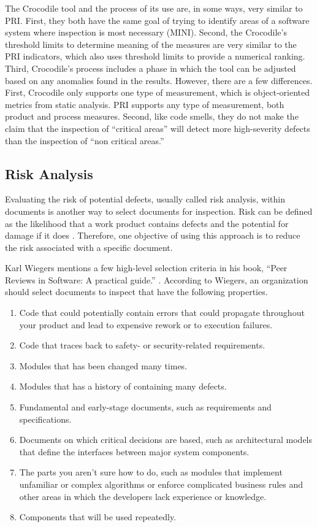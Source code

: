 The Crocodile tool and the process of its use are, in some ways, very
similar to PRI. First, they both have the same goal of trying to identify
areas of a software system where inspection is most necessary (MINI).
Second, the Crocodile's threshold limits to determine meaning of the
measures are very similar to the PRI indicators, which also uses threshold
limits to provide a numerical ranking. Third, Crocodile's process includes
a phase in which the tool can be adjusted based on any anomalies found in
the results. However, there are a few differences. First, Crocodile only
supports one type of measurement, which is object-oriented metrics from
static analysis. PRI supports any type of measurement, both product and
process measures. Second, like code smells, they do not make the claim that
the inspection of ``critical areas'' will detect more high-severity defects
than the inspection of ``non critical areas.''


\subsection{Risk Analysis}
Evaluating the risk of potential defects, usually called risk analysis,
within documents is another way to select documents for inspection. Risk
can be defined as the likelihood that a work product contains defects and
the potential for damage if it does \cite{Wiegers02}. Therefore, one
objective of using this approach is to reduce the risk associated with a
specific document.

Karl Wiegers mentions a few high-level selection criteria in his book,
``Peer Reviews in Software: A practical guide.'' \cite{Wiegers02}.
According to Wiegers, an organization should select documents to inspect
that have the following properties.

\begin{enumerate}
\item Code that could potentially contain errors that could propagate
  throughout your product and lead to expensive rework or to execution
  failures.
\item Code that traces back to safety- or security-related requirements.
\item Modules that has been changed many times.
\item Modules that has a history of containing many defects. 
\item Fundamental and early-stage documents, such as requirements and
  specifications. 
\item Documents on which critical decisions are based, such as
  architectural models that define the interfaces between major system
  components.
\item The parts you aren't sure how to do, such as modules that implement
  unfamiliar or complex algorithms or enforce complicated business rules
  and other areas in which the developers lack experience or knowledge.
\item Components that will be used repeatedly.
\end{enumerate}

